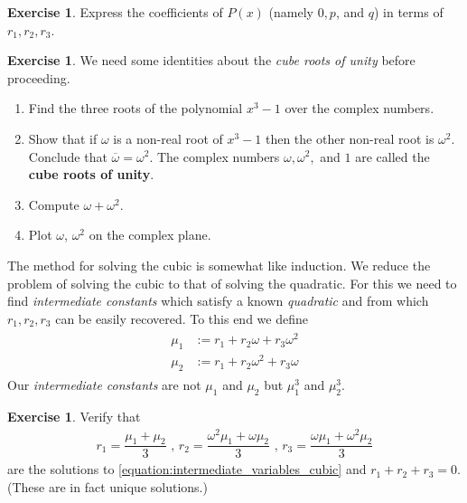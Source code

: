 \documentclass[reqno, 12pt, letter]{article}
\theoremstyle{plain}
\theoremstyle{definition}
\newtheorem{exercise}[theorem]{Exercise}
\theoremstyle{remark}
\numberwithin{equation}{section}
\begin{document}
	\begin{exercise}
	\label{exercise:coefficients_depressed_cubic}
	Express the coefficients of $P(x)$ (namely $ 0,p$, and $q$) in terms of $ r_1, r_2, r_3$.
	\end{exercise}

	\begin{exercise}
	\label{exercise:cube_roots_of_unity}
	We need some identities about the \emph{cube roots of unity} before proceeding.
	\begin{enumerate}
		\item Find the three roots of the polynomial $ x^3 - 1$ over the complex numbers.
		\item Show that if $ \omega $ is a non-real root of $x^3 -1$ then the other non-real root is $ \omega^2$. Conclude that $ \overline{\omega} = \omega^2$.
			The complex numbers $\omega, \omega^2,$ and $1$ are called the \textbf{cube roots of unity}.
    \item Compute $ \omega + \omega^2$.
		\item Plot $ \omega$, $\omega^2$ on the complex plane.
	\end{enumerate}
\end{exercise}
  The method for solving the cubic is somewhat like induction. We reduce the problem of solving the cubic to that of solving the quadratic. For this we need to find \emph{intermediate constants} which satisfy a known \emph{quadratic} and from which $r_1,r_2,r_3$ can be easily recovered. To this end we define
	\begin{align}
		\label{equation:intermediate_variables_cubic}
		\begin{split}
    \mu_1 &:= r_1 + r_2 \omega + r_3 \omega^2 \\
    \mu_2 &:= r_1 + r_2 \omega^2 + r_3 \omega
	\end{split}
  \end{align} 
	Our \emph{intermediate constants} are not $ \mu_1$ and $ \mu_2$ but $ \mu_1^3$ and $ \mu_2^3$.


	\begin{exercise}
		\label{exercise:intermediate_variables_cubic_1}
		Verify that
		\begin{align*}
			r_1 = \dfrac{\mu_1 + \mu_2}{3} 
			\mbox { , } r_2 = \dfrac{\omega^2 \mu_1 + \omega \mu_2}{3}
			\mbox { , } r_3 = \dfrac{\omega \mu_1 + \omega^2 \mu_2}{3}
		\end{align*}
		are the solutions to \autoref{equation:intermediate_variables_cubic} and $ r_1 + r_2 + r_3 = 0$. (These are in fact unique solutions.)
	\end{exercise}
	
\end{document}

